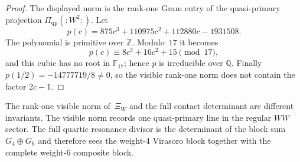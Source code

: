 \begin{proof}
The displayed norm is the rank-one Gram entry of the quasi-primary
projection $\Pi_{\mathrm{qp}}(:W^2:)$. Let
\[
p(c)=875c^3+110975c^2+112880c-1931508 .
\]
The polynomial is primitive over $\mathbb Z$. Modulo~$17$ it becomes
\[
p(c)\equiv 8c^3+16c^2+15\pmod {17},
\]
and this cubic has no root in $\mathbb F_{17}$; hence $p$ is
irreducible over $\mathbb Q$. Finally
$p(1/2)=-14777719/8\neq0$, so the visible rank-one norm does not
contain the factor $2c-1$.
\end{proof}

\begin{remark}
\label{rem:nms-visible-vs-full-resonance}
The rank-one visible norm of~$\Xi_W$ and the full contact determinant
are different invariants. The visible norm records one quasi-primary
line in the regular $WW$ sector. The full quartic resonance divisor is
the determinant of the block sum $G_4\oplus G_6$ and therefore sees
the weight-$4$ Virasoro block together with the complete weight-$6$
composite block.
\end{remark}

